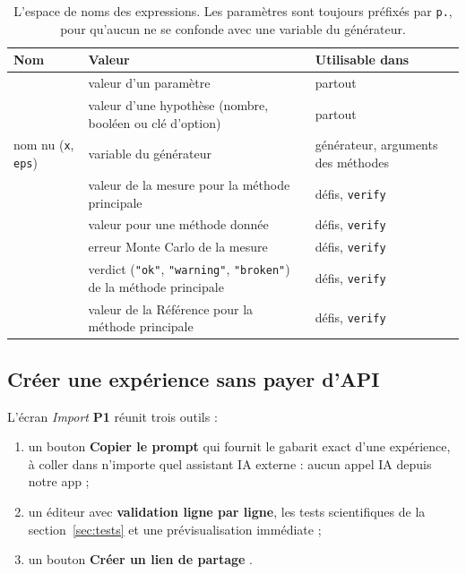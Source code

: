 \documentclass[11pt,a4paper]{article}
\newcommand{\pone}{\colorbox{ctMethod!18}{\footnotesize\textbf{P1}}}
\begin{document}
\begin{table}[H]
  \centering
  \small
  \begin{tabularx}{\textwidth}{@{}L{3.6cm} Y L{4.4cm}@{}}
    \toprule
    \textbf{Nom} & \textbf{Valeur} & \textbf{Utilisable dans} \\
    \midrule
     & valeur d'un paramètre & partout \\
     & valeur d'une hypothèse (nombre, booléen ou clé d'option) & partout \\
    nom nu (\texttt{x}, \texttt{eps}) & variable du générateur & générateur, arguments des méthodes \\
     & valeur de la mesure pour la méthode principale & défis, \texttt{verify} \\
     & valeur pour une méthode donnée & défis, \texttt{verify} \\
     & erreur Monte Carlo de la mesure & défis, \texttt{verify} \\
     & verdict (\texttt{"ok"}, \texttt{"warning"}, \texttt{"broken"}) de la méthode principale & défis, \texttt{verify} \\
     & valeur de la Référence pour la méthode principale & défis, \texttt{verify} \\
    \bottomrule
  \end{tabularx}
  \caption{L'espace de noms des expressions. Les paramètres sont toujours préfixés par \texttt{p.}, pour qu'aucun ne se confonde avec une variable du générateur.}
\end{table}

\subsection{Créer une expérience sans payer d'API}
L'écran \emph{Import} \pone{} réunit trois outils :
\begin{enumerate}[leftmargin=*, nosep]
  \item un bouton \textbf{\og Copier le prompt \fg{}} qui fournit le gabarit exact d'une expérience, à coller dans n'importe quel assistant IA externe : aucun appel IA depuis notre app ;
  \item un éditeur avec \textbf{validation ligne par ligne}, les tests scientifiques de la section~\ref{sec:tests} et une prévisualisation immédiate ;
  \item un bouton \textbf{\og Créer un lien de partage \fg{}}.
\end{enumerate}
\end{document}
